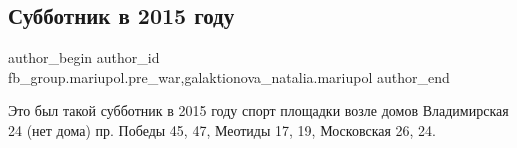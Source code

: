  
 
 
 
 

\subsection{Субботник в 2015 году}
\label{sec:08_03_2023.fb.fb_group.mariupol.pre_war.1.subbotnik_v_2015_god}
 
\ifcmt
 author_begin
   author_id fb_group.mariupol.pre_war,galaktionova_natalia.mariupol
 author_end
\fi

Это был такой субботник в 2015 году спорт площадки возле домов Владимирская 24
(нет дома) пр. Победы 45, 47, Меотиды 17, 19, Московская 26, 24.

